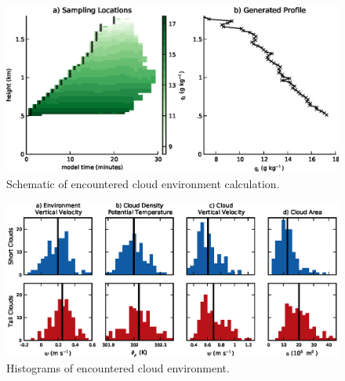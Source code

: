 \documentclass[acp]{copernicus}
\begin{document}
\begin{figure}[t]
\vspace*{2mm}
\begin{center}
\includegraphics[width=\textwidth]{./figures/cloud_environment_schematic}
\end{center}
\caption{Schematic of encountered cloud environment calculation.}
\label{fig:cloud_envionment_schematic}
\end{figure}

\begin{figure}[t]
\vspace*{2mm}
\begin{center}
\includegraphics[width=\textwidth]{./figures/cloud_environment_histograms}
\end{center}
\caption{Histograms of encountered cloud environment.}
\label{fig:cloud_envionment_histograms}
\end{figure}
\end{document}
